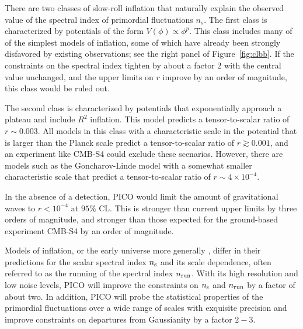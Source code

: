 \documentclass[PICOReport.tex]{subfiles}
\begin{document}
There are two classes of slow-roll inflation that naturally explain the observed value of the 
spectral index of primordial fluctuations $n_s$. The first class is characterized by potentials of the 
form $V(\phi)\propto\phi^p$. This class includes many of of the simplest models of inflation, 
some of which have already been strongly disfavored by existing observations; see the right panel of 
Figure~\ref{fig:clbb}. If the constraints on the spectral index tighten by about a factor 2 with the 
central value unchanged, and the upper limits on $r$ improve by an order of magnitude, this class 
would be ruled out. 

The second class is characterized by potentials that exponentially approach a plateau  and include $R^2$ inflation. This model predicts a tensor-to-scalar ratio 
of $r\sim 0.003$. All models in this class with a characteristic scale in the potential that is larger 
than the Planck scale predict a tensor-to-scalar ratio
of $r\gtrsim 0.001$,  and an experiment like CMB-S4 could 
exclude these scenarios. 
However, there are models such as the Goncharov-Linde model with a somewhat smaller 
characteristic scale that predict a tensor-to-scalar ratio of $r\sim 4\times 10^{-4}$. 

In the absence of a detection, PICO would limit the amount of gravitational waves to 
$r<10^{-4}$ at $95\%$ CL. This is stronger than current upper limits by three orders of magnitude, 
and stronger than those expected for the ground-based experiment CMB-S4 by an order of magnitude. 

Models of inflation, or the early universe more generally , 
differ in their predictions for the scalar spectral index $n_{\rm s}$ and its scale dependence, 
often referred to as the running of the spectral index $n_{\rm run}$. With its high resolution 
and low noise levels, PICO will improve the constraints on $n_{\rm s}$ and $n_{\rm run}$ by a factor 
of about two. In addition, PICO will probe the statistical properties of the primordial fluctuations 
over a wide range of scales with exquisite precision and improve constraints on departures from 
Gaussianity by a factor $2-3$.
\end{document}
